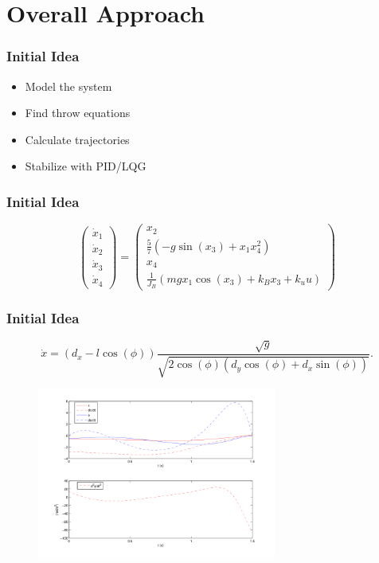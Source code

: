 \documentclass[
compress]
{beamer}
\begin{document}
\section{Overall Approach}
\frame{\sectionpage}
\begin{frame}
\frametitle{Initial Idea}
\begin{itemize}
\item Model the system
\item Find throw equations
\item Calculate trajectories
\item Stabilize with PID/LQG
\end{itemize}
\end{frame}

\begin{frame}
\frametitle{Initial Idea}

\begin{equation*}
\begin{pmatrix}
\dot{x}_{1}\\
\dot{x}_{2}\\
\dot{x}_{3}\\
\dot{x}_{4}
\end{pmatrix}=\begin{pmatrix}x_{2}\\
\frac{5}{7}\left(-g\sin(x_{3})+x_{1}x_{4}^{2}\right)\\
x_{4}\\
\frac{1}{J_B}(mgx_{1}\cos(x_3)+k_Bx_3+k_{u}u)
\end{pmatrix}
\end{equation*}
\begin{figure}
\centering
\scalebox{0.7}{}
\end{figure}
\end{frame}

\begin{frame}
\frametitle{Initial Idea}
\[
\dot{x}=\left(d_{x}-l\cos(\phi)\right)\frac{\sqrt{g}}{\sqrt{2\cos(\phi)\left(d_{y}\cos(\phi)+d_{x}\sin(\phi)\right)}}.
\]
\begin{figure}
\includegraphics[width=0.7\textwidth]{ballbeammatlab}
\end{figure}

\end{frame}
\end{document}
